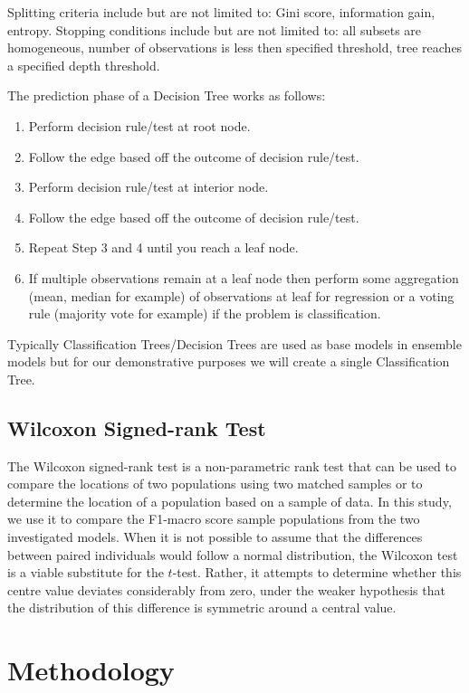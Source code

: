 \documentclass[conference]{IEEEtran}
\begin{document}
Splitting criteria include but are not limited to: Gini score, information gain, entropy. Stopping conditions include but are not limited to: all subsets are homogeneous, number of observations is less then specified threshold, tree reaches a specified depth threshold\cite[p.~11]{info}.

The prediction phase of a Decision Tree works as follows\cite[p.~122]{fundamentals}:

\begin{enumerate}
	\item Perform decision rule/test at root node.
	\item Follow the edge based off the outcome of decision rule/test.
	\item Perform decision rule/test at interior node.
	\item Follow the edge based off the outcome of decision rule/test.
	\item Repeat Step 3 and 4 until you reach a leaf node.
	\item If multiple observations remain at a leaf node then perform some aggregation (mean, median for example) of observations at leaf for regression or a voting rule (majority vote for example) if the problem is classification. 
\end{enumerate}

Typically Classification Trees/Decision Trees are used as base models in ensemble models but for our demonstrative purposes we will create a single Classification Tree.

\subsection{Wilcoxon Signed-rank Test}

The Wilcoxon signed-rank test is a non-parametric rank test that can be used to compare the locations of two populations using two matched samples or to determine the location of a population based on a sample of data\cite{wilcoxon}. In this study, we use it to compare the F1-macro score sample populations from the two investigated models. When it is not possible to assume that the differences between paired individuals would follow a normal distribution, the Wilcoxon test is a viable substitute for the $t$-test. Rather, it attempts to determine whether this centre value deviates considerably from zero, under the weaker hypothesis that the distribution of this difference is symmetric around a central value\cite{wilcoxon}.


\section{Methodology}
\end{document}
